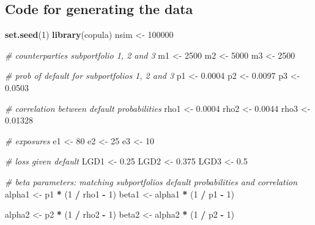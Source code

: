 \documentclass[
]{article}
\newenvironment{Shaded}{\begin{snugshade}}{\end{snugshade}}
\newcommand{\CommentTok}[1]{\textcolor[rgb]{0.56,0.35,0.01}{\textit{#1}}}
\newcommand{\DecValTok}[1]{\textcolor[rgb]{0.00,0.00,0.81}{#1}}
\newcommand{\FloatTok}[1]{\textcolor[rgb]{0.00,0.00,0.81}{#1}}
\newcommand{\KeywordTok}[1]{\textcolor[rgb]{0.13,0.29,0.53}{\textbf{#1}}}
\newcommand{\NormalTok}[1]{#1}
\newcommand{\OperatorTok}[1]{\textcolor[rgb]{0.81,0.36,0.00}{\textbf{#1}}}
\newcommand{\StringTok}[1]{\textcolor[rgb]{0.31,0.60,0.02}{#1}}
\begin{document}
\hypertarget{code-for-generating-the-data}{%
\subsection{Code for generating the data}\label{code-for-generating-the-data}}

\begin{Shaded}
\begin{Highlighting}[]
  \KeywordTok{set.seed}\NormalTok{(}\DecValTok{1}\NormalTok{)}
  \KeywordTok{library}\NormalTok{(copula)}
\NormalTok{  nsim <-}\StringTok{ }\DecValTok{100000}
  
\CommentTok{# counterparties subportfolio 1, 2 and 3}
\NormalTok{  m1 <-}\StringTok{ }\DecValTok{2500}
\NormalTok{  m2 <-}\StringTok{ }\DecValTok{5000}
\NormalTok{  m3 <-}\StringTok{ }\DecValTok{2500}
  
  \CommentTok{# prob of default for subportfolios 1, 2 and 3}
\NormalTok{  p1 <-}\StringTok{ }\FloatTok{0.0004} 
\NormalTok{  p2 <-}\StringTok{ }\FloatTok{0.0097} 
\NormalTok{  p3 <-}\StringTok{ }\FloatTok{0.0503}  
  
  \CommentTok{# correlation between default probabilities}
\NormalTok{  rho1 <-}\StringTok{ }\FloatTok{0.0004}
\NormalTok{  rho2 <-}\StringTok{ }\FloatTok{0.0044}
\NormalTok{  rho3 <-}\StringTok{ }\FloatTok{0.01328}
  
\CommentTok{# exposures}
\NormalTok{  e1 <-}\StringTok{ }\DecValTok{80}
\NormalTok{  e2 <-}\StringTok{ }\DecValTok{25} 
\NormalTok{  e3 <-}\StringTok{ }\DecValTok{10} 
  
\CommentTok{# loss given default}
\NormalTok{  LGD1 <-}\StringTok{ }\FloatTok{0.25}
\NormalTok{  LGD2 <-}\StringTok{ }\FloatTok{0.375}
\NormalTok{  LGD3 <-}\StringTok{ }\FloatTok{0.5}
  
\CommentTok{# beta parameters: matching subportfolios default probabilities and correlation}
\NormalTok{  alpha1 <-}\StringTok{ }\NormalTok{p1 }\OperatorTok{*}\StringTok{ }\NormalTok{(}\DecValTok{1} \OperatorTok{/}\StringTok{ }\NormalTok{rho1 }\OperatorTok{-}\StringTok{ }\DecValTok{1}\NormalTok{)}
\NormalTok{  beta1 <-}\StringTok{ }\NormalTok{alpha1 }\OperatorTok{*}\StringTok{ }\NormalTok{(}\DecValTok{1} \OperatorTok{/}\StringTok{ }\NormalTok{p1 }\OperatorTok{-}\StringTok{ }\DecValTok{1}\NormalTok{)}
  
\NormalTok{  alpha2 <-}\StringTok{ }\NormalTok{p2 }\OperatorTok{*}\StringTok{ }\NormalTok{(}\DecValTok{1} \OperatorTok{/}\StringTok{ }\NormalTok{rho2 }\OperatorTok{-}\StringTok{ }\DecValTok{1}\NormalTok{)}
\NormalTok{  beta2 <-}\StringTok{ }\NormalTok{alpha2 }\OperatorTok{*}\StringTok{ }\NormalTok{(}\DecValTok{1} \OperatorTok{/}\StringTok{ }\NormalTok{p2 }\OperatorTok{-}\StringTok{ }\DecValTok{1}\NormalTok{)}
  

\end{Highlighting}
\end{Shaded}
\end{document}
